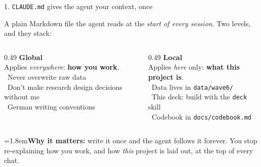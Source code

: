 \documentclass[aspectratio=169, 11pt, t]{beamer}
\newcommand{\mk}[1]{\textcolor{seeblau}{\textbf{#1}}}
\newcommand{\hint}[2]{\par\noindent\hangindent=1.8em\hangafter=1\textcolor{seeblau}{#1}\quad #2\par}
\begin{document}
\begin{frame}[fragile]{1. \texttt{CLAUDE.md} gives the agent your context, once}

\small
A plain Markdown file the agent reads at the \emph{start of every session}. Two levels, and they stack:

\vspace{0.6em}
\begin{columns}[T]
  \begin{column}{0.49\textwidth}
    \textbf{\textcolor{seeblau}{Global}} \\[0.4em]
    Applies \emph{everywhere}: \mk{how you work}.\\[0.5em]
    \footnotesize
    \textbullet\ Never overwrite raw data\\
    \textbullet\ Don't make research design decisions without me\\
    \textbullet\ German writing conventions
  \end{column}
  \begin{column}{0.49\textwidth}
    \textbf{\textcolor{seeblau}{Local}} \\[0.4em]
    Applies \emph{here} only: \mk{what this project is}.\\[0.5em]
    \footnotesize
    \textbullet\ Data lives in \texttt{data/wave6/}\\
    \textbullet\ This deck: build with the \texttt{deck} skill\\
    \textbullet\ Codebook in \texttt{docs/codebook.md}
  \end{column}
\end{columns}

\vfill
\hint{\faLightbulb}{\textbf{Why it matters:} write it once and the agent follows it forever. You stop re-explaining how you work, and how \emph{this} project is laid out, at the top of every chat.}

\end{frame}
\end{document}

